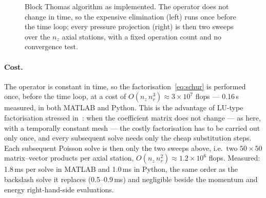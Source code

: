 \documentclass[12pt,a4paper]{article}
\begin{document}
\begin{figure}[H]
\caption{Block Thomas algorithm as implemented. The operator does not change in time, so the
expensive elimination (left) runs once before the time loop; every pressure projection
(right) is then two sweeps over the $n_z$ axial stations, with a fixed operation count and
no convergence test.}
\label{fig:bt_flowchart}
\end{figure}


\paragraph{Cost.}
The operator is constant in time, so the factorisation~\eqref{eq:schur} is performed once, before the time loop, at a cost of $O(n_z\,n_r^3) \approx 3 \times 10^{7}$ flops --- 0.16\,s measured, in both MATLAB and Python.
This is the advantage of LU-type factorisation stressed in~\cite{Steiner2025}: when the
coefficient matrix does not change --- as here, with a temporally constant mesh --- the costly
factorisation has to be carried out only once, and every subsequent solve needs only the cheap
substitution steps.
Each subsequent Poisson solve is then only the two sweeps above, i.e.\ two $50 \times 50$ matrix--vector products per axial station, $O(n_z\,n_r^2) \approx 1.2 \times 10^{6}$ flops.
Measured: 1.8\,ms per solve in MATLAB and 1.0\,ms in Python, the same order as the backslash solve it replaces (0.5--0.9\,ms) and negligible beside the momentum and energy right-hand-side evaluations.
\end{document}
